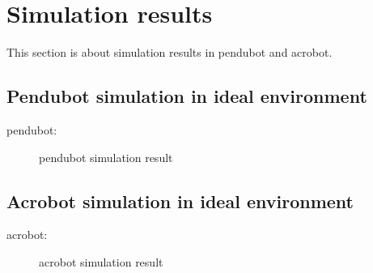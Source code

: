\section{Simulation results}
This section is about simulation results in pendubot and acrobot.
\subsection{Pendubot simulation in ideal environment}
pendubot:
\begin{figure}[H]
    \centering
    \caption{pendubot simulation result}
    \label{fig:image_a}
\end{figure}

\subsection{Acrobot simulation in ideal environment}
acrobot:
\begin{figure}[htbp]
    \centering
    \caption{acrobot simulation result}
    \label{fig:image_b}
\end{figure}


\cleardoublepage
